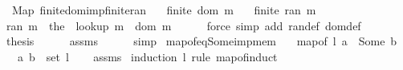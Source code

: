 \begin{isabellebody}
\isanewline
{}\isamarkupfalse%
\ {\isacharparenleft}{\kern0pt}\ Map{\isacharparenright}{\kern0pt}\ finite{\isacharunderscore}{\kern0pt}dom{\isacharunderscore}{\kern0pt}imp{\isacharunderscore}{\kern0pt}finite{\isacharunderscore}{\kern0pt}ran{\isacharcolon}{\kern0pt}\isanewline
\ \ \ {\isachardoublequoteopen}finite\ {\isacharparenleft}{\kern0pt}dom\ m{\isacharparenright}{\kern0pt}{\isachardoublequoteclose}\isanewline
\ \ \ {\isachardoublequoteopen}finite\ {\isacharparenleft}{\kern0pt}ran\ m{\isacharparenright}{\kern0pt}{\isachardoublequoteclose}\isanewline
%
\isadelimproof
%
\endisadelimproof
%
\isatagproof
{}\isamarkupfalse%
\ {\isacharminus}{\kern0pt}\isanewline
\ \ \isamarkupfalse%
\ {\isachardoublequoteopen}ran\ m\ {\isacharequal}{\kern0pt}\ {\isacharparenleft}{\kern0pt}the\ {\isasymcirc}\ lookup\ m{\isacharparenright}{\kern0pt}\ {\isacharbackquote}{\kern0pt}\ dom\ m{\isachardoublequoteclose}\isanewline
\ \ \ \ \isamarkupfalse%
\ {\isacharparenleft}{\kern0pt}force\ simp\ add{\isacharcolon}{\kern0pt}\ ran{\isacharunderscore}{\kern0pt}def\ dom{\isacharunderscore}{\kern0pt}def{\isacharparenright}{\kern0pt}\isanewline
\ \ \isamarkupfalse%
\ {\isacharquery}{\kern0pt}thesis\isanewline
\ \ \ \ \isamarkupfalse%
\ assms\isanewline
\ \ \ \ \isamarkupfalse%
\ simp\isanewline
{}\isamarkupfalse%
%
\endisatagproof
{\isafoldproof}%
%
\isadelimproof
%
\endisadelimproof
%
\isadelimdocument
%
\endisadelimdocument
%
\isatagdocument
%
\isamarkuptrue%
%
\endisatagdocument
{\isafolddocument}%
%
\isadelimdocument
%
\endisadelimdocument
{}\isamarkupfalse%
\ map{\isacharunderscore}{\kern0pt}of{\isacharunderscore}{\kern0pt}eq{\isacharunderscore}{\kern0pt}Some{\isacharunderscore}{\kern0pt}imp{\isacharunderscore}{\kern0pt}mem{\isacharcolon}{\kern0pt}\isanewline
\ \ \ {\isachardoublequoteopen}map{\isacharunderscore}{\kern0pt}of\ l\ a\ {\isacharequal}{\kern0pt}\ Some\ b{\isachardoublequoteclose}\isanewline
\ \ \ {\isachardoublequoteopen}{\isacharparenleft}{\kern0pt}a{\isacharcomma}{\kern0pt}\ b{\isacharparenright}{\kern0pt}\ {\isasymin}\ set\ l{\isachardoublequoteclose}\isanewline
%
\isadelimproof
\ \ %
\endisadelimproof
%
\isatagproof
{}\isamarkupfalse%
\ assms\isanewline
{}\isamarkupfalse%
\ {\isacharparenleft}{\kern0pt}induction\ l\ rule{\isacharcolon}{\kern0pt}\ map{\isacharunderscore}{\kern0pt}of{\isachardot}{\kern0pt}induct{\isacharparenright}{\kern0pt}\isanewline

\end{isabellebody}
